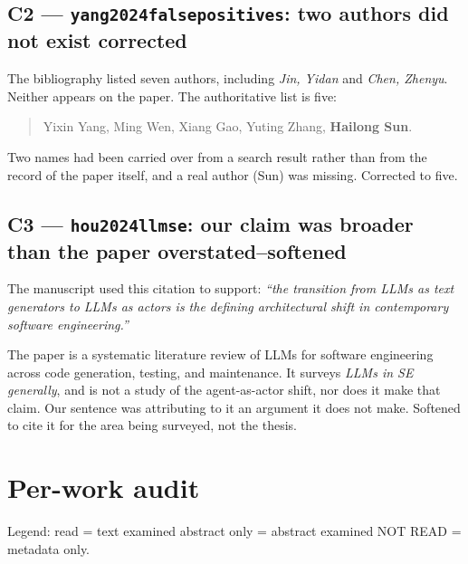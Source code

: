 \documentclass[10pt,a4paper]{article}
\newcommand{\fix}{\textcolor{red!75!black}{\textbf{corrected}}}
\newcommand{\weak}{\textcolor{orange!90!black}{\textbf{overstated--softened}}}
\newcommand{\noread}{\textcolor{red!75!black}{NOT READ}}
\newcommand{\absread}{\textcolor{orange!90!black}{abstract only}}
\newcommand{\fullread}{\textcolor{green!55!black}{read}}
\begin{document}
\subsection*{C2 --- \texttt{yang2024falsepositives}: two authors did not exist \fix}

The bibliography listed seven authors, including \emph{Jin, Yidan} and \emph{Chen, Zhenyu}. Neither
appears on the paper. The authoritative list is five:
\begin{quote}\small
Yixin Yang, Ming Wen, Xiang Gao, Yuting Zhang, \textbf{Hailong Sun}.
\end{quote}
Two names had been carried over from a search result rather than from the record of the paper
itself, and a real author (Sun) was missing. Corrected to five.

\subsection*{C3 --- \texttt{hou2024llmse}: our claim was broader than the paper \weak}

The manuscript used this citation to support: \emph{``the transition from LLMs as text generators
to LLMs as actors is the defining architectural shift in contemporary software engineering.''}

The paper is a systematic literature review of LLMs for software engineering across code
generation, testing, and maintenance. It surveys \emph{LLMs in SE generally}, and is not a study
of the agent-as-actor shift, nor does it make that claim. Our sentence was attributing to it an
argument it does not make. Softened to cite it for the area being surveyed, not the thesis.

\section{Per-work audit}

Legend: \fullread{} = text examined \quad \absread{} = abstract examined \quad
\noread{} = metadata only.
\end{document}
